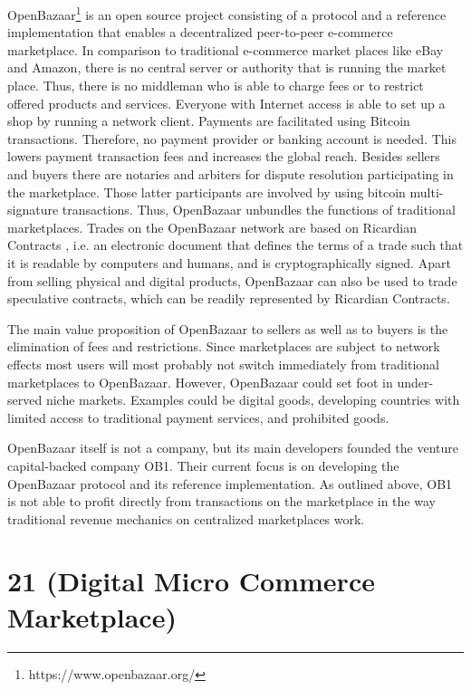 {OpenBazaar\footnote{https://www.openbazaar.org/} is an open source project consisting of a protocol and a reference 
implementation that enables a decentralized peer-to-peer e-commerce marketplace. 
In comparison to traditional e-commerce market places like eBay and Amazon, there 
is no central server or authority that is running the market place. Thus, there 
is no middleman who is able to charge fees or to restrict offered products and 
services. Everyone with Internet access is able to set up a shop by running a network 
client. Payments are facilitated using Bitcoin transactions. Therefore, no payment 
provider or banking account is needed. This lowers payment transaction fees and 
increases the global reach. Besides sellers and buyers there are notaries and arbiters 
for dispute resolution participating in the marketplace. Those latter participants 
are involved by using bitcoin multi-signature transactions. Thus, OpenBazaar unbundles 
the functions of traditional marketplaces. Trades on the OpenBazaar network are 
based on Ricardian Contracts \parencite{1319505}, i.e. an electronic document that defines 
the terms of a trade such that it is readable by computers and humans, and is cryptographically 
signed. Apart from selling physical and digital products, OpenBazaar can also be 
used to trade speculative contracts, which can be readily represented by Ricardian 
Contracts. 

The main value proposition of OpenBazaar to sellers as well as to buyers is the 
elimination of fees and restrictions. Since marketplaces are subject to network 
effects most users will most probably not switch immediately from traditional marketplaces 
to OpenBazaar. However, OpenBazaar could set foot in under-served niche markets. 
Examples could be digital goods, developing countries with limited access to traditional 
payment services, and prohibited goods. 

OpenBazaar itself is not a company, but its main developers founded the venture 
capital-backed company OB1. Their current focus is on developing the OpenBazaar 
protocol and its reference implementation. As outlined above, OB1 is not able to 
profit directly from transactions on the marketplace in the way traditional revenue 
mechanics on centralized marketplaces work. 

\section{21 (Digital Micro Commerce Marketplace)}
\label{sec:eco21}

}

